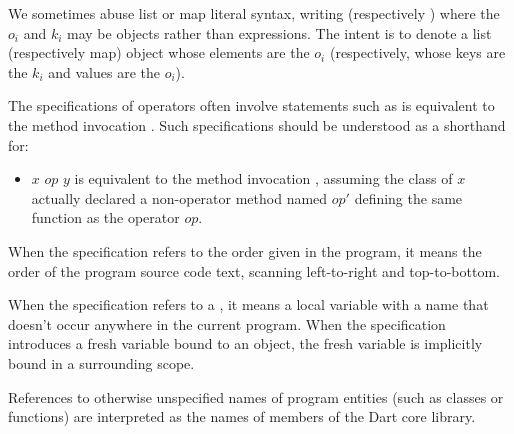 \documentclass[makeidx]{article}
\begin{document}

\LMHash{}%
We sometimes abuse list or map literal syntax, writing \code{[\List{o}{1}{n}]}
(respectively )
where the $o_i$ and $k_i$ may be objects rather than expressions.
The intent is to denote a list (respectively map) object
whose elements are the $o_i$
(respectively, whose keys are the $k_i$ and values are the $o_i$).

\LMHash{}%
%
The specifications of operators often involve statements such as
 is equivalent to the method invocation
.
Such specifications should be understood as a shorthand for:

\begin{itemize}
\item
  $x$ $op$ $y$ is equivalent to the method invocation
  ,
  assuming the class of $x$ actually declared a non-operator method named $op'$
  defining the same function as the operator $op$.
\end{itemize}


\LMHash{}%
When the specification refers to the order given in the program,
it means the order of the program source code text,
scanning left-to-right and top-to-bottom.

\LMHash{}%
When the specification refers to a
,
it means a local variable with a name that doesn't occur anywhere
in the current program.
When the specification introduces a fresh variable bound to an object,
the fresh variable is implicitly bound in a surrounding scope.

\LMHash{}%
References to otherwise unspecified names of program entities
(such as classes or functions)
are interpreted as the names of members of the Dart core library.

\end{document}
